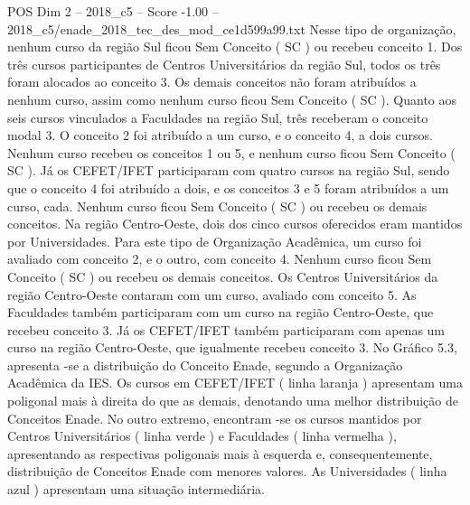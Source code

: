 \begin{textsample}{POS Dim 2 – 2018\_c5 – Score -1.00 – 2018\_c5/enade\_2018\_tec\_des\_mod\_ce1d599a99.txt}
Nesse tipo de organização, nenhum curso da região Sul ficou Sem Conceito ( SC ) ou recebeu conceito 1.
Dos três cursos participantes de Centros Universitários da região Sul, todos os três foram alocados ao conceito 3.
Os demais conceitos não foram atribuídos a nenhum curso, assim como nenhum curso ficou Sem Conceito ( SC ).
Quanto aos seis cursos vinculados a Faculdades na região Sul, três receberam o conceito modal 3.
O conceito 2 foi atribuído a um curso, e o conceito 4, a dois cursos.
Nenhum curso recebeu os conceitos 1 ou 5, e nenhum curso ficou Sem Conceito ( SC ).
Já os CEFET/IFET participaram com quatro cursos na região Sul, sendo que o conceito 4 foi atribuído a dois, e os conceitos 3 e 5 foram atribuídos a um curso, cada.
Nenhum curso ficou Sem Conceito ( SC ) ou recebeu os demais conceitos.
Na região Centro-Oeste, dois dos cinco cursos oferecidos eram mantidos por Universidades.
Para este tipo de Organização Acadêmica, um curso foi avaliado com conceito 2, e o outro, com conceito 4.
Nenhum curso ficou Sem Conceito ( SC ) ou recebeu os demais conceitos.
Os Centros Universitários da região Centro-Oeste contaram com um curso, avaliado com conceito 5.
As Faculdades também participaram com um curso na região Centro-Oeste, que recebeu conceito 3.
Já os CEFET/IFET também participaram com apenas um curso na região Centro-Oeste, que igualmente recebeu conceito 3.
No Gráfico 5.3, apresenta -se a distribuição do Conceito Enade, segundo a Organização Acadêmica da IES.
Os cursos em CEFET/IFET ( linha laranja ) apresentam uma poligonal mais à direita do que as demais, denotando uma melhor distribuição de Conceitos Enade.
No outro extremo, encontram -se os cursos mantidos por Centros Universitários ( linha verde ) e Faculdades ( linha vermelha ), apresentando as respectivas poligonais mais à esquerda e, consequentemente, distribuição de Conceitos Enade com menores valores.
As Universidades ( linha azul ) apresentam uma situação intermediária.

\end{textsample}
